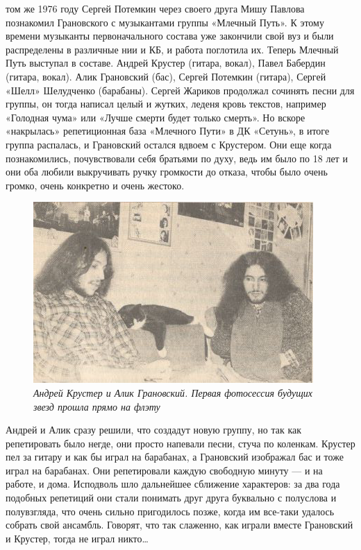 \documentclass[16pt,a5paper,oneside]{book}
\begin{document}
 том же 1976 году Сергей Потемкин через своего друга Мишу Павлова познакомил Грановского с музыкантами группы
«Млечный Путь». К этому времени музыканты первоначального состава уже закончили свой вуз и были распределены в различные
нии и КБ, и работа поглотила их. Теперь Млечный Путь выступал в составе. Андрей Крустер (гитара, вокал), Павел Бабердин
(гитара, вокал). Алик Грановский (бас), Сергей Потемкин (гитара), Сергей «Шелл» Шелудченко (барабаны). Сергей Жариков
продолжал сочинять песни для группы, он тогда написал целый и жутких, леденя кровь текстов, например «Голодная чума» или
«Лучше смерти будет только смерть». Но вскоре «накрылась» репетиционная база «Млечного Пути» в ДК «Сетунь», в итоге
группа распалась, и Грановский остался вдвоем с Крустером. Они еще когда познакомились, почувствовали себя братьями по
духу, ведь им было по 18 лет и они оба любили выкручивать ручку громкости до отказа, чтобы было очень громко, очень
конкретно и очень жестоко.

\begin{figure}
    \centering
    \includegraphics[scale=0.8]{Image05}
    \caption{\textit{Андрей Крустер и Алик Грановский. Первая фотосессия будущих звезд прошла прямо на флэту}}
\end{figure}

Андрей и Алик сразу решили, что создадут новую группу, но так как репетировать было негде, они просто напевали песни,
стуча по коленкам. Крустер пел за гитару и как бы играл на барабанах, а Грановский изображал бас и тоже играл на
барабанах. Они репетировали каждую свободную минуту — и на работе, и дома. Исподволь шло дальнейшее сближение
характеров: за два года подобных репетиций они стали понимать друг друга буквально с полуслова и полувзгляда, что очень
сильно пригодилось позже, когда им все-таки удалось собрать свой ансамбль. Говорят, что так слаженно, как играли вместе
Грановский и Крустер, тогда не играл никто\ldots
\end{document}
